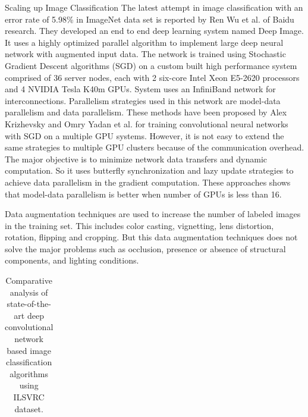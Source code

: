 \documentclass{article}
\begin{document}
\begin{subsection}{Scaling up Image Classification}
The latest attempt in image classification with an error rate of 5.98\% in ImageNet data set is reported by Ren Wu et al. \cite{Wu2015} of Baidu research. They developed an end to end deep learning  system named Deep Image. It uses a highly optimized parallel algorithm to implement large deep neural network with augmented input data. The network is trained using Stochastic Gradient Descent algorithms (SGD) on a custom built high performance system comprised of 36 server nodes, each with 2 six-core Intel Xeon E5-2620 processors and 4 NVIDIA Tesla K40m GPUs. System  uses an InfiniBand  network for interconnections. Parallelism strategies used in this network are model-data parallelism and data parallelism. These methods have been proposed by Alex Krizhevsky \cite{Krizhevsky2014} and Omry Yadan et al. \cite{Yadan2013} for training convolutional neural networks with SGD on a  multiple GPU systems. However, it is not easy to extend the same strategies to multiple GPU clusters because of the communication overhead. The major objective is to minimize network data transfers and dynamic computation. So it uses butterfly synchronization and lazy update strategies to achieve data parallelism in the gradient computation. These approaches shows that model-data parallelism is better when number of GPUs is less than 16. %
\par
Data augmentation techniques are used to increase the number of labeled images in the training set. This includes color casting, vignetting, lens distortion, rotation, flipping and cropping. But this data augmentation techniques  does not solve the major problems such as occlusion, presence or absence of structural components, and lighting conditions.
\centering
\begin{table}[ht]
\captionsetup{justification=centering,belowskip=1pt,aboveskip=1pt}
\caption[]{ Comparative analysis of state-of-the-art deep convolutional network based image classification algorithms using ILSVRC dataset.}
 \begin{tabular}{ | p{2.7cm} | l | p{1.4cm} |p{1.1cm} |p{.8cm} |p{1.3cm} |p{1.1cm} |p{5cm}|}


\end{tabular}
\end{table}
\end{subsection}
\end{document}
